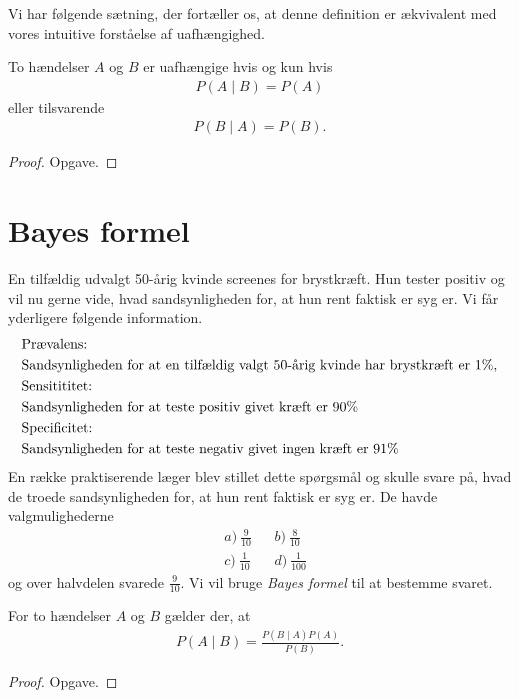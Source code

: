 Vi har følgende sætning, der fortæller os, at denne definition er ækvivalent med vores intuitive forståelse af uafhængighed.
\begin{setn}
	\label{setn:uaf}
	To hændelser $A$ og $B$ er uafhængige hvis og kun hvis
	\begin{align*}
		P(A \mid B) = P(A)
	\end{align*}
	eller tilsvarende
	\begin{align*}
		P(B \mid A) = P(B).
	\end{align*}
\end{setn}
\begin{proof}
	Opgave.
\end{proof}

\section*{Bayes formel}

En tilfældig udvalgt 50-årig kvinde screenes for brystkræft. Hun tester positiv og vil nu gerne vide, hvad sandsynligheden for, at hun rent faktisk er syg er. Vi får yderligere følgende information.
\begin{align*}
	&\textnormal{Prævalens: }\\
	&\textnormal{Sandsynligheden for at en tilfældig valgt 50-årig kvinde har brystkræft er 1} \%,\\
	&\textnormal{Sensitititet:}\\
	&\textnormal{Sandsynligheden for at teste positiv givet kræft er 90\%}\\
	&\textnormal{Specificitet:} \\
	&\textnormal{Sandsynligheden for at teste negativ givet ingen kræft er 91\%}
\end{align*}
En række praktiserende læger blev stillet dette spørgsmål og skulle svare på, hvad de troede sandsynligheden for, at hun rent faktisk er syg er. De havde valgmulighederne
\begin{align*}
	&a) \ \frac{9}{10} & &b) \ \frac{8}{10} \\
	&c) \ \frac{1}{10} & &d) \ \frac{1}{100}
\end{align*}
og over halvdelen svarede $\frac{9}{10}$. Vi vil bruge \textit{Bayes formel} til at bestemme svaret.

\begin{setn}
	For to hændelser $A$ og $B$ gælder der, at 
	\begin{align*}
		P(A \mid B) = \frac{P(B \mid A)P(A)}{P(B)}.
	\end{align*}
\end{setn} 
\begin{proof}
	Opgave.
\end{proof}

